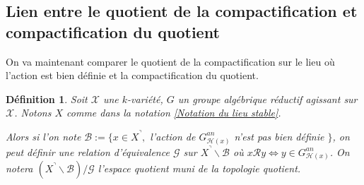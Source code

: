 \documentclass[11pt]{article}
\newcommand{\N}{\mathbb{N}}
\newtheorem{lem}[thm]{Lemme}
\newtheorem{defi}[thm]{Définition}
\begin{document}
\subsection{Lien entre le quotient de la compactification et compactification du quotient}

On va maintenant comparer le quotient de la compactification sur le lieu où l'action est bien définie et la compactification du quotient.

\begin{defi}\label{définition lieu ou action est bien def et action définie dessus}
Soit $\mathcal{X}$ une $k$-variété, $G$ un groupe algébrique réductif agissant sur $\mathcal{X}$. Notons $X$ comme dans la notation \ref{Notation du lieu stable}. 

Alors si l'on note $\mathcal{B} := \lbrace x\in X^\urcorner,$ l'action de $G_{\mathcal{H}(x)}^{an}$ n'est pas bien définie $\rbrace$, on peut définir une relation d'équivalence $\mathcal{G}$ sur $X^\urcorner \backslash \mathcal{B}$ où $x\mathcal{R}y \iff y \in G^{an}_{\mathcal{H}(x)}$. On notera $(X^\urcorner \backslash \mathcal{B})/\mathcal{G}$ l'espace quotient muni de la topologie quotient.
\end{defi}

%
%
\end{document}
